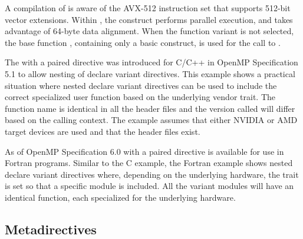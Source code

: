 A compilation of  is aware of
the AVX-512 instruction set that supports 512-bit vector extensions.
Within , the  construct performs parallel execution, and
takes advantage of 64-byte data alignment. 
When the  function variant is not selected, the base function ,
containing only a basic  construct, is used for the call to .




The  with a paired  directive was introduced 
for C/C++ in OpenMP Specification 5.1 to allow nesting of declare variant directives. 
This example shows a practical situation where nested declare variant directives can be used 
to include the correct specialized user function based on the underlying vendor  trait. 
The function name  is identical in all the header files and the version called will 
differ based on the calling context. The example assumes that either NVIDIA or AMD target devices are used 
and that the header files exist. 



As of OpenMP Specification 6.0  with a paired  
directive is available for use in Fortran programs. Similar to the C example, the Fortran example shows 
nested declare variant directives where, depending on the underlying hardware, the  trait is set 
so that a specific module is included. All the variant modules will have an identical 
 function, each specialized for the underlying hardware. 


\subsection{Metadirectives}
\label{subsec:metadirective}

